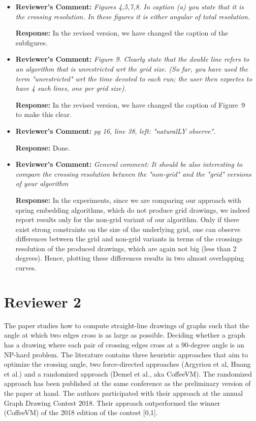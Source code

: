 \documentclass{article}
\newcommand{\rcomment}[1]{\vspace{0.3cm} \item \textbf{Reviewer's Comment:} {\em #1}}
\newcommand{\response}{\vspace{0.2cm} \textbf{Response: }}
\begin{document}
\begin{itemize}
\rcomment{Figures 4,5,7,8. In caption (a) you state that it is the crossing resolution. In these figures it is either angular of total resolution.}

\response{In the revised version, we have changed the caption of the subfigures.}

\rcomment{Figure 9. Clearly state that the double line refers to an algorithm that is unrestricted wrt the grid size. (So far, you have used the term "unrestricted" wrt the time devoted to each run; the user then expectes to have 4 such lines, one per grid size).}

\response{In the revised version, we have changed the caption of Figure~9 to make this clear.}

\rcomment{pg 16, line 38, left: "naturalLY observe".}

\response{Done.}

\rcomment{General comment: It should be also interesting to compare the crossing resolution between the "non-grid" and the "grid" versions of your algorithm}

\response{In the experiments, since we are comparing our approach with spring embedding algorithms, which do not produce grid drawings, we indeed report results only for the non-grid variant of our algorithm. Only if there exist strong constraints on the size of the underlying grid, one can observe differences between the grid and non-grid variants  in terms of the crossings resolution of the produced drawings, which are again not big (less than 2 degrees). Hence, plotting these differences results in two almost overlapping curves.}
\end{itemize}


\newpage
\section*{Reviewer 2}

The paper studies how to compute straight-line drawings of graphs such that the angle at which two edges cross is as large as possible. Deciding whether a graph has a drawing where each pair of crossing edges cross at a 90-degree angle is an NP-hard problem. The literature contains three heuristic approaches that aim to optimize the crossing angle, two force-directed approaches (Argyriou et al, Huang et al.) and a randomized approach (Demel et al., aka CoffeeVM). The randomized approach has been published at the same conference as the preliminary version of the paper at hand.  The authors participated with their approach at the annual Graph Drawing Contest 2018. Their approach outperformed the winner (CoffeeVM) of the 2018 edition of the contest [0,1].
\end{document}
